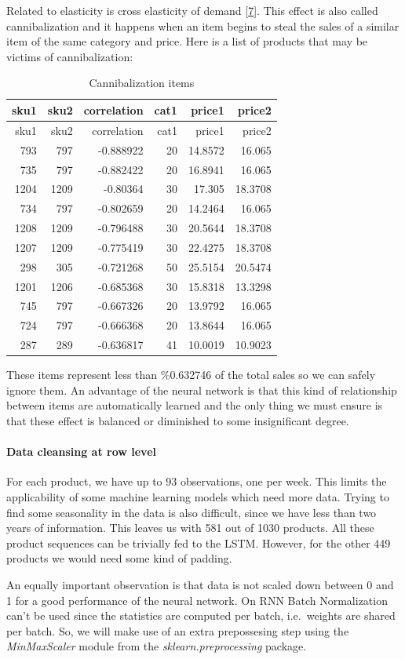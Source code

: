 \documentclass[]{article}
\let\oldparagraph\paragraph
\renewcommand{\paragraph}[1]{\oldparagraph{#1}\mbox{}}
\theoremstyle{definition}
\theoremstyle{definition}
\theoremstyle{definition}
\theoremstyle{remark}
\begin{document}
Related to elasticity is cross elasticity of demand
{[}\protect\hyperlink{ref-Frank2014}{7}{]}. This effect is also called
cannibalization and it happens when an item begins to steal the sales of
a similar item of the same category and price. Here is a list of
products that may be victims of cannibalization:

\begin{longtable}[]{@{}rrrrrr@{}}
\caption{\label{tab:tab2} Cannibalization items}\tabularnewline
\toprule
sku1 & sku2 & correlation & cat1 & price1 & price2\tabularnewline
\midrule
\endfirsthead
\toprule
sku1 & sku2 & correlation & cat1 & price1 & price2\tabularnewline
\midrule
\endhead
793 & 797 & -0.888922 & 20 & 14.8572 & 16.065\tabularnewline
735 & 797 & -0.882422 & 20 & 16.8941 & 16.065\tabularnewline
1204 & 1209 & -0.80364 & 30 & 17.305 & 18.3708\tabularnewline
734 & 797 & -0.802659 & 20 & 14.2464 & 16.065\tabularnewline
1208 & 1209 & -0.796488 & 30 & 20.5644 & 18.3708\tabularnewline
1207 & 1209 & -0.775419 & 30 & 22.4275 & 18.3708\tabularnewline
298 & 305 & -0.721268 & 50 & 25.5154 & 20.5474\tabularnewline
1201 & 1206 & -0.685368 & 30 & 15.8318 & 13.3298\tabularnewline
745 & 797 & -0.667326 & 20 & 13.9792 & 16.065\tabularnewline
724 & 797 & -0.666368 & 20 & 13.8644 & 16.065\tabularnewline
287 & 289 & -0.636817 & 41 & 10.0019 & 10.9023\tabularnewline
\bottomrule
\end{longtable}

These items represent less than \%0.632746 of the total sales so we can
safely ignore them. An advantage of the neural network is that this kind
of relationship between items are automatically learned and the only
thing we must ensure is that these effect is balanced or diminished to
some insignificant degree.

\paragraph{Data cleansing at row
level}\label{data-cleansing-at-row-level}

For each product, we have up to 93 observations, one per week. This
limits the applicability of some machine learning models which need more
data. Trying to find some seasonality in the data is also difficult,
since we have less than two years of information. This leaves us with
581 out of 1030 products. All these product sequences can be trivially
fed to the LSTM. However, for the other 449 products we would need some
kind of padding.

An equally important observation is that data is not scaled down between
0 and 1 for a good performance of the neural network. On RNN Batch
Normalization can't be used since the statistics are computed per batch,
i.e.~weights are shared per batch. So, we will make use of an extra
prepossesing step using the \emph{MinMaxScaler} module from the
\emph{sklearn.preprocessing} package.
\end{document}

